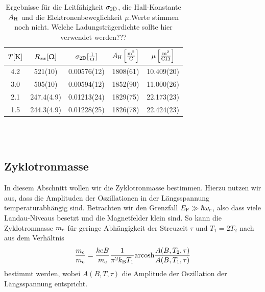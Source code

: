 \documentclass[paper=a4,fontsize=10pt,DIV=18,twocolumn,parskip=half]{scrartcl}
\numberwithin{equation}{section}    %
\newcommand{\note}[1]{{\color{red}#1??}}
\newcommand{\kor}[1]{{\color{darkgreen}#1}}
\begin{document}
\begin{table}[htp]
	\begin{center}
		\kor{\begin{tabular}{ccccc}
			\hline
			$T[\rm K]$ & $R_{xx}[\Upomega]$ & $\sigma_{\rm 2D}[\frac{1}{\Upomega}]$ & $A_{\rm H}\left[ \frac{\mathrm{m}^2}{\mathrm{C}} \right]$ & $\mu \left[ \frac{\mathrm{m}^2}{\mathrm{C}\Upomega} \right]$\\
			\hline
			4.2 & 521(10) & 0.00576(12) & 1808(61) & 10.409(20)\\
			3.0 & 505(10) & 0.00594(12) & 1852(90) & 11.000(26)\\
			2.1 & 247.4(4.9) & 0.01213(24) & 1829(75) & 22.173(23)\\
			1.5 & 244.3(4.9) & 0.01228(25) & 1826(78) & 22.424(23)\\
			\hline
		\end{tabular}}
		\caption{Ergebnisse für die Leitfähigkeit $\sigma_{\rm 2D}$, die Hall-Konstante $A_{\rm H}$ und die Elektronenbeweglichkeit $\mu$.\note{Werte stimmen noch nicht. Welche Ladungsträgerdichte sollte hier verwendet werden?}}
		\label{tab.leithallbeweg}
	\end{center}
\end{table}
%
~~~~~~~~~~~~~~~~~~~~~~~~~~~~~~~~~~~~~~~~~~~~~~~~~~~~~~~~~~~~~~~~~~~~~~~~~~~~~
\subsection{Zyklotronmasse}
\label{a4}

In diesem Abschnitt wollen wir die Zyklotronmasse bestimmen. Hierzu nutzen wir aus, dass die Amplituden der Oszillationen in der Längsspannung temperaturabhängig sind. Betrachten wir den Grenzfall $E_{\rm F} \gg \hbar\omega_{\rm c}$, also dass viele Landau-Niveaus besetzt und die Magnetfelder klein sind. So kann die Zyklotronmasse $m_{\rm c}$ für geringe Abhängigkeit der Streuzeit $\tau$ und $T_{1} = 2T_{2}$ nach~\citet{ando} aus dem Verhältnis
\begin{equation}
	\frac{m_{\rm c}}{m_{\rm e}} = \frac{\hbar e B}{m_{\rm e}} \frac{1}{\pi^2 k_{\rm B} T_{1}}\mathrm{arcosh}\frac{A(B,T_2,\tau)}{A(B,T_1,\tau)}
	\label{eq:zyklotronmasse}
\end{equation}
bestimmt werden, wobei $A(B,T,\tau)$ die Amplitude der Oszillation der Längsspannung entspricht.
\end{document}
